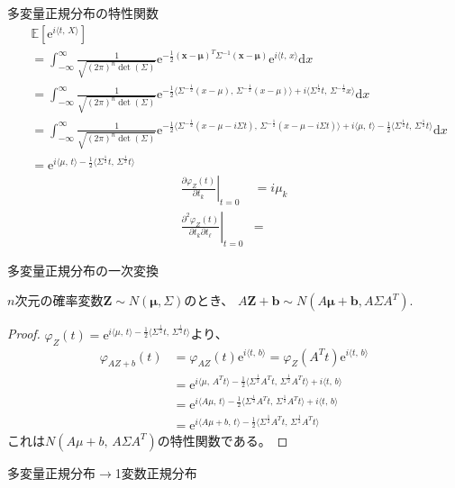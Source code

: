 \documentclass[lualatex,handout]{beamer}
\newcommand{\expt}[1]{\mathbb{E}\left[#1\right]}
\theoremstyle{definition}
\begin{document}
\begin{frame}{多変量正規分布の特性関数}
\small
\begin{align*}
&\expt{\mathrm{e}^{i\langle t,\,X\rangle}}\\
&=\int_{-\infty}^\infty \frac1{\sqrt{(2\pi)^n\det(\Sigma)}} \mathrm{e}^{-\frac12 (\symbf{x}-\symbf{\mu})^T\Sigma^{-1} (\symbf{x}-\symbf{\mu})}\mathrm{e}^{i\langle t,\, x\rangle}\mathrm{d}x\\
&= \int_{-\infty}^\infty \frac1{\sqrt{(2\pi)^n\det(\Sigma)}} \mathrm{e}^{-\frac12 \langle\Sigma^{-\frac12}(x-\mu),\,\Sigma^{-\frac12}(x-\mu)\rangle+i\langle \Sigma^{\frac12}t,\, \Sigma^{-\frac12}x\rangle}\mathrm{d}x\\
&= \int_{-\infty}^\infty \frac1{\sqrt{(2\pi)^n\det(\Sigma)}} \mathrm{e}^{-\frac12 \langle\Sigma^{-\frac12}(x-\mu-i\Sigma t),\,\Sigma^{-\frac12}(x-\mu-i\Sigma t)\rangle +i\langle \mu,\, t\rangle - \frac12\langle \Sigma^\frac12t,\,\Sigma^\frac12t\rangle}\mathrm{d}x\\
&= \mathrm{e}^{i\langle \mu,\, t\rangle - \frac12\langle \Sigma^\frac12t,\,\Sigma^\frac12t\rangle}
\end{align*}
\begin{align*}
\left.\frac{\partial \varphi_Z(t)}{\partial t_k}\right|_{t=0} &= i\mu_k\\
\left.\frac{\partial^2 \varphi_Z(t)}{\partial t_k\partial t_\ell}\right|_{t=0} &= 
\end{align*}
\end{frame}

\begin{frame}{多変量正規分布の一次変換}
\begin{lemma}
$n$次元の確率変数$\symbf{Z}\sim N(\symbf{\mu}, \Sigma)$のとき、
$A\symbf{Z}+\symbf{b}\sim N(A\symbf{\mu}+\symbf{b}, A\Sigma A^T)$.
\end{lemma}
\begin{proof}
$\varphi_Z(t) = \mathrm{e}^{i\langle \mu,\, t\rangle - \frac12\langle \Sigma^\frac12t,\,\Sigma^\frac12t\rangle}$より、
\begin{align*}
\varphi_{AZ+b}(t) &= \varphi_{AZ}(t)\mathrm{e}^{i\langle t,\,b\rangle} = \varphi_Z(A^Tt)\mathrm{e}^{i\langle t,\,b\rangle}\\
&= \mathrm{e}^{i\langle \mu,\, A^T t\rangle - \frac12\langle \Sigma^\frac12A^T t,\,\Sigma^\frac12A^T t\rangle + i\langle t,\,b\rangle}\\
&= \mathrm{e}^{i\langle A\mu,\, t\rangle - \frac12\langle \Sigma^\frac12A^T t,\,\Sigma^\frac12A^T t\rangle+ i\langle t,\,b\rangle}\\
&= \mathrm{e}^{i\langle A\mu + b,\, t\rangle - \frac12\langle \Sigma^\frac12A^T t,\,\Sigma^\frac12A^T t\rangle}
\end{align*}
これは$N(A\mu+b,\, A\Sigma A^T)$の特性関数である。
\end{proof}
\end{frame}

\begin{frame}{多変量正規分布$\to$1変数正規分布}
\end{frame}
\end{document}
